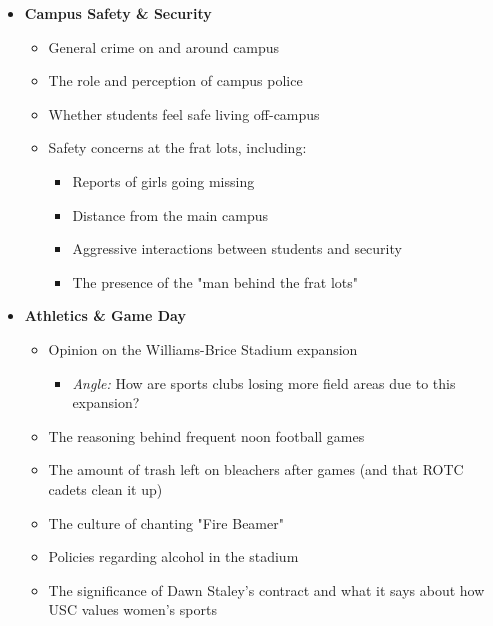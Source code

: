 \documentclass{article}
\begin{document}
\begin{itemize}
  \begin{itemize}
  \item
    Deteriorating conditions of apartments and dorms
  \item
    The high cost of accessible apartments
  \item
    The university's plan to buy land for Greek Village
    expansion

    \begin{itemize}
    \item
      \emph{Angle:} How this expansion, combined with the Williams-Brice
      expansion, reduces available field areas for sports clubs.
    \end{itemize}
  \end{itemize}
\item
  \textbf{Campus Safety \& Security}

  \begin{itemize}
  \item
    General crime on and around campus
  \item
    The role and perception of campus police
  \item
    Whether students feel safe living off-campus
  \item
    Safety concerns at the frat lots, including:

    \begin{itemize}
    \item
      Reports of girls going missing
    \item
      Distance from the main campus
    \item
      Aggressive interactions between students and security
    \item
      The presence of the "man behind the frat lots"
    \end{itemize}
  \end{itemize}
\item
  \textbf{Athletics \& Game Day}

  \begin{itemize}
  \item
    Opinion on the Williams-Brice Stadium expansion

    \begin{itemize}
    \item
      \emph{Angle:} How are sports clubs losing more field areas due to
      this expansion?
    \end{itemize}
  \item
    The reasoning behind frequent noon football games
  \item
    The amount of trash left on bleachers after games (and that ROTC
    cadets clean it up)
  \item
    The culture of chanting "Fire Beamer"
  \item
    Policies regarding alcohol in the stadium
  \item
    The significance of Dawn Staley's contract and what
    it says about how USC values women's sports
  \end{itemize}
\end{itemize}
\end{document}
